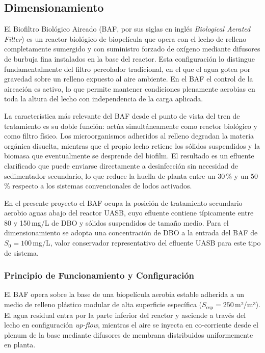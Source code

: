 \documentclass[12pt,a4paper]{article}
\begin{document}
\subsection{Dimensionamiento}

El Biofiltro Biológico Aireado (BAF, por sus siglas en inglés \textit{Biological Aerated Filter}) es un reactor biológico de biopelícula que opera con el lecho de relleno completamente sumergido y con suministro forzado de oxígeno mediante difusores de burbuja fina instalados en la base del reactor. Esta configuración lo distingue fundamentalmente del filtro percolador tradicional, en el que el agua gotea por gravedad sobre un relleno expuesto al aire ambiente. En el BAF el control de la aireación es activo, lo que permite mantener condiciones plenamente aerobias en toda la altura del lecho con independencia de la carga aplicada.

La característica más relevante del BAF desde el punto de vista del tren de tratamiento es su doble función: actúa simultáneamente como reactor biológico y como filtro físico. Los microorganismos adheridos al relleno degradan la materia orgánica disuelta, mientras que el propio lecho retiene los sólidos suspendidos y la biomasa que eventualmente se desprende del biofilm. El resultado es un efluente clarificado que puede enviarse directamente a desinfección sin necesidad de sedimentador secundario, lo que reduce la huella de planta entre un 30\,\% y un 50\,\% respecto a los sistemas convencionales de lodos activados.

En el presente proyecto el BAF ocupa la posición de tratamiento secundario aerobio aguas abajo del reactor UASB, cuyo efluente contiene típicamente entre 80 y 150\,mg/L de DBO y sólidos suspendidos de tamaño medio. Para el dimensionamiento se adopta una concentración de DBO a la entrada del BAF de $S_0 = 100$\,mg/L, valor conservador representativo del efluente UASB para este tipo de sistema.

\subsubsection*{Principio de Funcionamiento y Configuración}

El BAF opera sobre la base de una biopelícula aerobia estable adherida a un medio de relleno plástico modular de alta superficie específica ($S_{\text{esp}} = 250$\,m²/m³). El agua residual entra por la parte inferior del reactor y asciende a través del lecho en configuración \textit{up-flow}, mientras el aire se inyecta en co-corriente desde el plenum de la base mediante difusores de membrana distribuidos uniformemente en planta.
\end{document}
